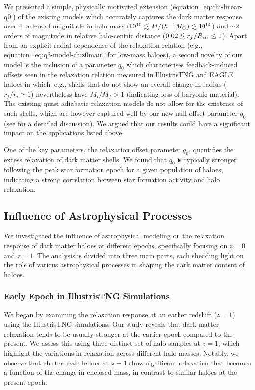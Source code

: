 We presented a simple, physically motivated extension (equation~\ref{eq:chi-linear-q0}) of the existing models which accurately captures the dark matter response over 4 orders of magnitude in halo mass ($10^{10}\lesssim M/(h^{-1}M_{\odot})\lesssim 10^{14}$) and $\sim2$ orders of magnitude in relative halo-centric distance ($0.02\lesssim r_f/R_{\rm vir}\leq1$). Apart from an explicit radial dependence of the relaxation relation (e.g., equation~\ref{eq:q3-model-ch:z0main} for low-mass haloes), a second novelty of our model is the inclusion of a parameter $q_0$ which characterises feedback-induced offsets seen in the relaxation relation measured in IllustrisTNG and EAGLE haloes in which, e.g., shells that do not show an overall change in radius ($r_f/r_i\simeq1$) nevertheless have $M_i/M_f>1$ (indicating loss of baryonic material). The existing quasi-adiabatic relaxation models do not allow for the existence of such shells, which are however captured well by our new null-offset parameter $q_0$ (see  for a detailed discussion).
We argued that our results could have a significant impact on the applications listed above.

One of the key parameters, the relaxation offset parameter \( q_0 \), quantifies the excess relaxation of dark matter shells. We found that \( q_0 \) is typically stronger following the peak star formation epoch for a given population of haloes, indicating a strong correlation between star formation activity and halo relaxation.

\subsection{Influence of Astrophysical Processes}
We investigated the influence of astrophysical modeling on the relaxation response of dark matter haloes at different epochs, specifically focusing on \( z=0 \) and \( z=1 \). The analysis is divided into three main parts, each shedding light on the role of various astrophysical processes in shaping the dark matter content of haloes.

\subsubsection*{Early Epoch in IllustrisTNG Simulations}
We began by examining the relaxation response at an earlier redshift (\( z=1 \)) using the IllustrisTNG simulations. Our study reveals that dark matter relaxation tends to be usually stronger at the earlier epoch compared to the present. We assess this using three distinct set of halo samples at \(z=1\), which highlight the variations in relaxation across different halo masses. Notably, we observe that cluster-scale haloes at \( z=1 \) show significant relaxation that becomes a function of the change in enclosed mass, in contrast to similar haloes at the present epoch.

